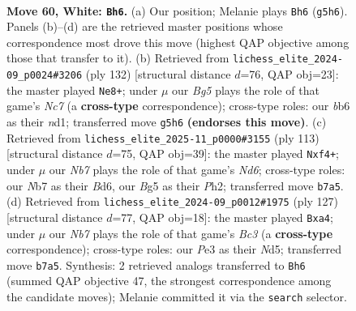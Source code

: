 \documentclass[11pt]{article}
\begin{document}
\clearpage

\begin{figure}[p]\centering
\begin{subfigure}{0.46\textwidth}\centering
\resizebox{\linewidth}{!}{%
\newchessgame
\chessboard[
  setfen={n7/1N1n1k2/1b6/p2p2Bb/8/PP2P2p/4P3/3B2K1 w - - 1 60},
  showmover=false,
  pgfstyle=straightmove, color=movearrow, markmove={g5-h6}
]}
\caption{}
\end{subfigure}\hfill
\begin{subfigure}{0.46\textwidth}\centering
\resizebox{\linewidth}{!}{%
\newchessgame
\chessboard[
  setfen={8/1pN5/1B1k1p2/P2p4/3P2P1/3K4/8/3n2b1 w - - 7 67},
  showmover=false,
  pgfstyle=straightmove, color=movearrow, markmove={c7-e8}
]}
\caption{}
\end{subfigure}
\\[4pt]
\begin{subfigure}{0.46\textwidth}\centering
\resizebox{\linewidth}{!}{%
\newchessgame
\chessboard[
  setfen={8/k7/P2bp3/2p2p2/2P2P2/3nB3/6Kp/7N b - - 0 57},
  showmover=false,
  pgfstyle=straightmove, color=movearrow, markmove={d3-f4}
]}
\caption{}
\end{subfigure}\hfill
\begin{subfigure}{0.46\textwidth}\centering
\resizebox{\linewidth}{!}{%
\newchessgame
\chessboard[
  setfen={6k1/2N3p1/2b4p/p2n2b1/P2P4/1B3PB1/8/5K2 b - - 1 64},
  showmover=false,
  pgfstyle=straightmove, color=movearrow, markmove={c6-a4}
]}
\caption{}
\end{subfigure}
\caption{\textbf{Move 60, White: \texttt{Bh6}.} (a) Our position; Melanie plays \texttt{Bh6} (\texttt{g5h6}). Panels (b)--(d) are the retrieved master positions whose correspondence most drove this move (highest QAP objective among those that transfer to it). (b) Retrieved from \texttt{lichess\_elite\_2024-09\_p0024\#3206} (ply 132) [structural distance $d$=76, QAP obj=23]: the master played \texttt{Ne8+}; under $\mu$ our \emph{Bg5} plays the role of that game's \emph{Nc7} (a \textbf{cross-type} correspondence); cross-type roles: our \emph{b}b6 as their \emph{n}d1; transferred move \texttt{g5h6} \textbf{(endorses this move)}. (c) Retrieved from \texttt{lichess\_elite\_2025-11\_p0000\#3155} (ply 113) [structural distance $d$=75, QAP obj=39]: the master played \texttt{Nxf4+}; under $\mu$ our \emph{Nb7} plays the role of that game's \emph{Nd6}; cross-type roles: our \emph{N}b7 as their \emph{B}d6, our \emph{B}g5 as their \emph{P}h2; transferred move \texttt{b7a5}. (d) Retrieved from \texttt{lichess\_elite\_2024-09\_p0012\#1975} (ply 127) [structural distance $d$=77, QAP obj=18]: the master played \texttt{Bxa4}; under $\mu$ our \emph{Nb7} plays the role of that game's \emph{Bc3} (a \textbf{cross-type} correspondence); cross-type roles: our \emph{P}e3 as their \emph{N}d5; transferred move \texttt{b7a5}. Synthesis: 2 retrieved analogs transferred to \texttt{Bh6} (summed QAP objective 47, the strongest correspondence among the candidate moves); Melanie committed it via the \texttt{search} selector.}
\label{fig:thought-m118}
\end{figure}
\end{document}
